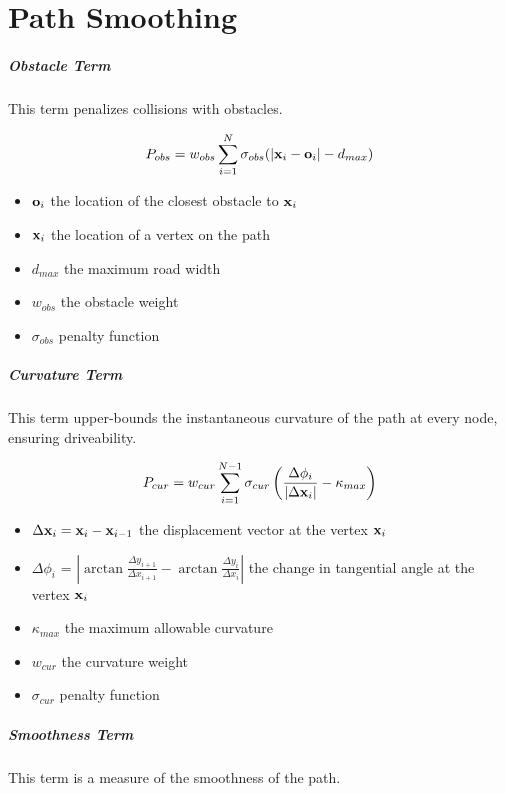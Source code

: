 \chapter{Path Smoothing}

\paragraph{Obstacle Term}
This term penalizes collisions with obstacles.

\[P_{obs} = w_{obs} \displaystyle\sum_{i=1}^{N} \sigma_{obs}(|\mathbf{x}_i-\mathbf{o}_i|-d_{max})\]

\begin{itemize}
\item $\mathbf{o}_i$ the location of the closest obstacle to $\mathbf{x}_i$
\item $\mathbf{x}_i$ the location of a vertex on the path
\item $d_{max}$ the maximum road width
\item $w_{obs}$ the obstacle weight
\item $\sigma_{obs}$ penalty function
\end{itemize}

\paragraph{Curvature Term}
This term upper-bounds the instantaneous curvature of the path at every node, ensuring driveability.

\[ P_{cur} = w_{cur} \displaystyle\sum_{i=1}^{N-1} \sigma_{cur}\left(\frac{\Delta\phi_i}{|\Delta\mathbf{x}_i|} - \kappa_{max}\right)\]

\begin{itemize}
\item $\Delta\mathbf{x}_i = \mathbf{x}_i - \mathbf{x}_{i-1}$ the displacement vector at the vertex $\mathbf{x}_i$
\item $\Delta\phi_i$ = $|\arctan\frac{\Delta y_{i+1}}{\Delta x_{i+1}} - \arctan\frac{\Delta y_{i}}{\Delta x_{i}}|$ the change in tangential angle at the vertex $\mathbf{x}_i$
\item $\kappa_{max}$ the maximum allowable curvature
\item $w_{cur}$ the curvature weight
\item $\sigma_{cur}$ penalty function
\end{itemize}

\paragraph{Smoothness Term}
This term is a measure of the smoothness of the path.


